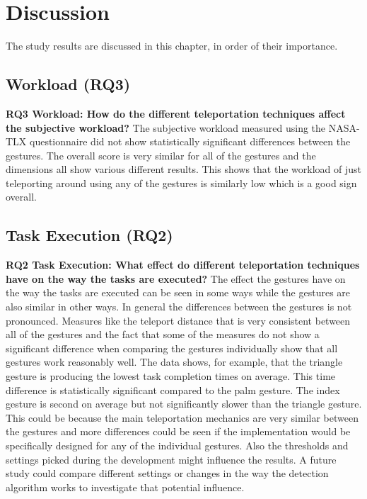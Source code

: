 \chapter{Discussion} %
The study results are discussed in this chapter, in order of their importance.

\section{Workload (RQ3)}
\textbf{RQ3 Workload: How do the different teleportation techniques affect the subjective workload?}
The subjective workload measured using the NASA-TLX questionnaire did not show statistically significant differences between the gestures. The overall score is very similar for all of the gestures and the dimensions all show various different results. This shows that the workload of just teleporting around using any of the gestures is similarly low which is a good sign overall. 

\section{Task Execution (RQ2)}
\textbf{RQ2 Task Execution: What effect do different teleportation techniques have on the way the tasks are executed?}
The effect the gestures have on the way the tasks are executed can be seen in some ways while the gestures are also similar in other ways. In general the differences between the gestures is not pronounced. Measures like the teleport distance that is very consistent between all of the gestures and the fact that some of the measures do not show a significant difference when comparing the gestures individually show that all gestures work reasonably well. The data shows, for example, that the triangle gesture is producing the lowest task completion times on average. This time difference is statistically significant compared to the palm gesture. The index gesture is second on average but not significantly slower than the triangle gesture. This could be because the main teleportation mechanics are very similar between the gestures and more differences could be seen if the implementation would be specifically designed for any of the individual gestures. Also the thresholds and settings picked during the development might influence the results. A future study could compare different settings or changes in the way the detection algorithm works to investigate that potential influence.


